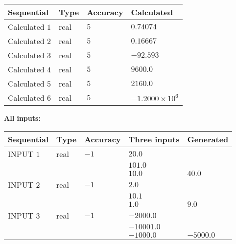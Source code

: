 \documentclass[12pt]{article}
\begin{document}
   
   
   
\noindent{}
   
   
  
  
\noindent\begin{tabular}{|l|l|l|l|}
\hline
 Sequential & Type & Accuracy & Calculated \\ 
\hline
 
 
  Calculated $            1 $ & real & $            5  $ & 
 $ 0.74074 $ 
 \\  \hline  
 
 
  Calculated $            2 $ & real & $            5  $ & 
 $ 0.16667 $ 
 \\  \hline  
 
 
  Calculated $            3 $ & real & $            5  $ & 
 $ -92.593 $ 
 \\  \hline  
 
 
  Calculated $            4 $ & real & $            5  $ & 
 $ 9600.0 $ 
 \\  \hline  
 
 
  Calculated $            5 $ & real & $            5  $ & 
 $ 2160.0 $ 
 \\  \hline  
 
 
  Calculated $            6 $ & real & $            5  $ & 
 $ -1.2000 \times 10^{6} $ 
 \\  \hline  
 \end{tabular}
   
   
   
   
\noindent\vspace{0.1in}\hspace{-0.08in} {\textbf{\Large{All inputs: }}}
   
   
  
  
\noindent\begin{tabular}{|l|l|l|l|l|}
\hline
 Sequential & Type & Accuracy & Three inputs & Generated \\ 
\hline
 
 
  INPUT $            1 $ & real & $           -1  $ & $
 20.0
  $ & \\
  & & &  $
 101.0
  $ & \\
  & & &  $
 10.0
 $ & $ 40.0 $ 
 \\  \hline  
 
 
  INPUT $            2 $ & real & $           -1  $ & $
 2.0
  $ & \\
  & & &  $
 10.1
  $ & \\
  & & &  $
 1.0
 $ & $ 9.0 $ 
 \\  \hline  
 
 
  INPUT $            3 $ & real & $           -1  $ & $
 -2000.0
  $ & \\
  & & &  $
 -10001.0
  $ & \\
  & & &  $
 -1000.0
 $ & $ -5000.0 $ 
 \\  \hline  
 \end{tabular}
   
\end{document}
